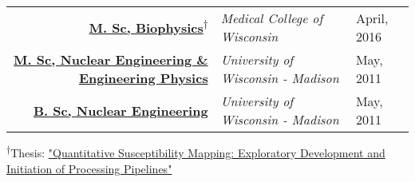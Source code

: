 


\begin{minipage}{\textwidth}
\begin{center}
	\begin{tabular}{rll}
		\href{https://app.box.com/s/62ffckadt53x8k93p9gp6ylbpqj9vscw}{\textbf{M. Sc, Biophysics}}\textsuperscript{$\dagger$} & \emph{Medical College of Wisconsin} & April, 2016 \\ %
		\href{https://app.box.com/s/yyxi60lex92ovm7dus1d5xu9xshdqd91}{\textbf{M. Sc, Nuclear Engineering \& Engineering Physics}} & \emph{University of Wisconsin - Madison} & May, 2011 \\ %
		\href{https://app.box.com/s/yyxi60lex92ovm7dus1d5xu9xshdqd91}{\textbf{B. Sc, Nuclear Engineering}} & \emph{University of Wisconsin - Madison}& May, 2011 \\ %
	\end{tabular}
\end{center}
\end{minipage}

\begin{minipage}{\textwidth}
\begin{center}
	\textsuperscript{$\dagger$}Thesis: \href{https://app.box.com/s/o8kksc6n51qpjzc3clfa127xtdfkayzd}{\normalsize"Quantitative Susceptibility Mapping: Exploratory Development and Initiation of Processing Pipelines"}
\end{center}
\end{minipage}


